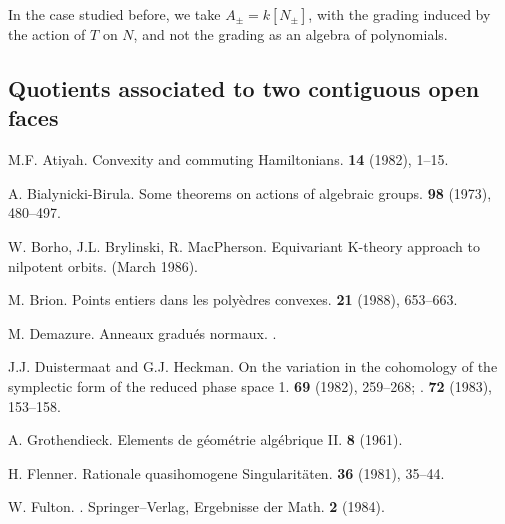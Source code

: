 \documentclass{article}
\begin{document}
In the case studied before, we take $A_\pm=k[N_\pm]$, with the grading induced by the action of $T$ on $N$, and not the grading as an algebra of polynomials.


\subsection{Quotients associated to two contiguous open faces}
\label{2.3}




\nocite{*}

\begin{thebibliography}{25}

  {M.F. Atiyah.}
  \newblock Convexity and commuting Hamiltonians.
   \textbf{14} (1982), 1--15.

  {A. Bialynicki-Birula.}
  \newblock Some theorems on actions of algebraic groups.
   \textbf{98} (1973), 480--497.

  {W. Borho, J.L. Brylinski, R. MacPherson.}
  \newblock Equivariant K-theory approach to nilpotent orbits.
   (March 1986).

  {M. Brion.}
  \newblock Points entiers dans les poly\`{e}dres convexes.
   \textbf{21} (1988), 653--663.

  {M. Demazure.}
  \newblock Anneaux gradu\'{e}s normaux.
  .

  {J.J. Duistermaat and G.J. Heckman.}
  \newblock On the variation in the cohomology of the symplectic form of the reduced phase space 1.
   \textbf{69} (1982), 259--268;
  .
   \textbf{72} (1983), 153--158.

  {A. Grothendieck.}
  \newblock Elements de g\'{e}om\'{e}trie alg\'{e}brique II.
   \textbf{8} (1961).

  {H. Flenner.}
  \newblock Rationale quasihomogene Singularit\"{a}ten.
   \textbf{36} (1981), 35--44.

  {W. Fulton.}
  .
  \newblock Springer--Verlag, {Ergebnisse der Math.} \textbf{2} (1984).


\end{thebibliography}
\end{document}
